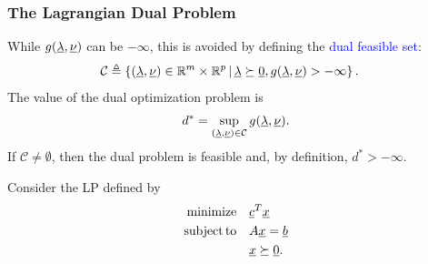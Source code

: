 \documentclass[10pt,english,hide notes,aspectratio=169]{beamer}
\begin{document}
\begin{frame} \frametitle{The Lagrangian Dual Problem}

While $g(\underline{\lambda},\underline{\nu})$ can be $-\infty$, this is avoided by defining the \textcolor{blue}{dual feasible set}:
\begin{align*}
\mathcal{C} &\triangleq \left\{ (\underline{\lambda},\underline{\nu}) \in \mathbb{R}^m \times \mathbb{R}^p \,|\, \underline{\lambda}\succeq \underline{0},  g(\underline{\lambda},\underline{\nu}) > -\infty \right\}.
\end{align*}
The value of the dual optimization problem is \vspace{-1mm}
\[ d^* = \sup_{(\vecnot{\lambda},\vecnot{\nu})\in \mathcal{C}} g(\vecnot{\lambda},\vecnot{\nu}). \vspace{-1mm} \]
If $\mathcal{C} \neq \emptyset$, then the dual problem is feasible and, by definition, $d^* > -\infty$.

\vspace{6mm}

Consider the LP defined by \vspace{-2mm}
\begin{align*}
\mathrm{minimize} \quad & \underline{c}^T \underline{x} \\
\mathrm{subject\,to} \quad & A \underline{x} = \underline{b} \\
& \underline{x} \succeq \underline{0}.
\end{align*}

\end{frame}
\end{document}
